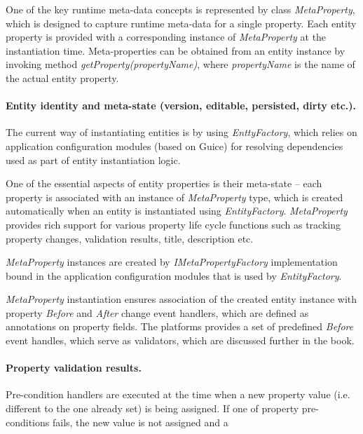   One of the key runtime meta-data concepts is represented by class \emph{MetaProperty}, which is designed to capture runtime meta-data for a single property.
  Each entity property is provided with a corresponding instance of \emph{MetaProperty} at the instantiation time.
  Meta-properties can be obtained from an entity instance by invoking method \emph{getProperty(propertyName)}, where \emph{propertyName} is the name of the actual entity property.

  \paragraph*{Entity identity and meta-state (version, editable, persisted, dirty etc.).}

  The current way of instantiating entities is by using \emph{EnttyFactory}, which relies on application configuration modules (based on Guice) for resolving dependencies used as part of entity instantiation logic.

  One of the essential aspects of entity properties is their meta-state -- each property is associated with an instance of \emph{MetaProperty} type, which is created automatically when an entity is instantiated using \emph{EntityFactory}. 
  \emph{MetaProperty} provides rich support for various property life cycle functions such as tracking property changes, validation results, title, description etc.

  \emph{MetaProperty} instances are created by \emph{IMetaPropertyFactory} implementation bound in the application configuration modules that is used by \emph{EntityFactory}.

  \emph{MetaProperty} instantiation ensures association of the created entity instance with property \emph{Before} and \emph{After} change event handlers, which are defined as annotations on property fields. 
  The platforms provides a set of predefined \emph{Before} event handles, which serve as validators, which are discussed further in the book. 
  

  \paragraph*{Property validation results.}

  Pre-condition handlers are executed at the time when a new property value (i.e. different to the one already set) is being assigned.
  If one of property pre-conditions fails, the new value is not assigned and a

